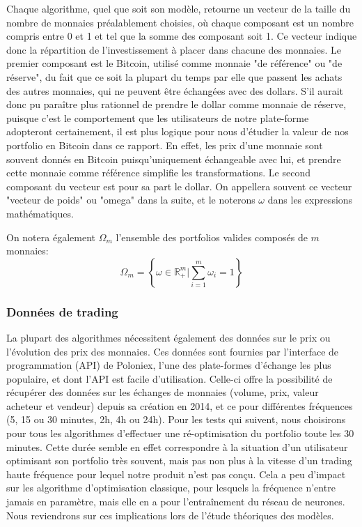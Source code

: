\documentclass[a4paper, 10pt]{article}
\begin{document}
Chaque algorithme, quel que soit son modèle, retourne un vecteur de la taille du nombre de monnaies préalablement choisies, où chaque composant est un nombre compris entre 0 et 1 et tel que la somme des composant soit 1. Ce vecteur indique donc la répartition de l'investissement à placer dans chacune des monnaies. Le premier composant est le Bitcoin, utilisé comme monnaie "de référence" ou "de réserve", du fait que ce soit la plupart du temps par elle que passent les achats des autres monnaies, qui ne peuvent être échangées avec des dollars. S'il aurait donc pu paraître plus rationnel de prendre le dollar comme monnaie de réserve, puisque c'est le comportement que les utilisateurs de notre plate-forme adopteront certainement, il est plus logique pour nous d'étudier la valeur de nos portfolio en Bitcoin dans ce rapport. En effet, les prix d'une monnaie sont souvent donnés en Bitcoin puisqu'uniquement échangeable avec lui, et prendre cette monnaie comme référence simplifie les transformations. Le second composant du vecteur est pour sa part le dollar. On appellera souvent ce vecteur "vecteur de poids" ou "omega" dans la suite, et le noterons $\omega$ dans les expressions mathématiques.

On notera également $\Omega_m$ l'ensemble des portfolios valides composés de $m$ monnaies:
\begin{equation}
    \Omega_m = \left \{\omega \in \mathbb{R}_{+}^m \bigg| \sum_{i=1}^{m} \omega_{i} = 1 \right \}
\end{equation}

\subsubsection{Données de trading}

La plupart des algorithmes nécessitent également des données sur le prix ou l'évolution des prix des monnaies. Ces données sont fournies par l'interface de programmation (API) de Poloniex, l'une des plate-formes d'échange les plus populaire, et dont l'API est facile d'utilisation. Celle-ci offre la possibilité de récupérer des données sur les échanges de monnaies (volume, prix, valeur acheteur et vendeur) depuis sa création en 2014, et ce pour différentes fréquences (5, 15 ou 30 minutes, 2h, 4h ou 24h). Pour les tests qui suivent, nous choisirons pour tous les algorithmes d'effectuer une ré-optimisation du portfolio toute les 30 minutes. Cette durée semble en effet correspondre à la situation d'un utilisateur optimisant son portfolio très souvent, mais pas non plus à la vitesse d'un trading haute fréquence pour lequel notre produit n'est pas conçu. Cela a peu d'impact sur les algorithme d'optimisation classique, pour lesquels la fréquence n'entre jamais en paramètre, mais elle en a pour l'entraînement du réseau de neurones. Nous reviendrons sur ces implications lors de l'étude théoriques des modèles.
\end{document}
